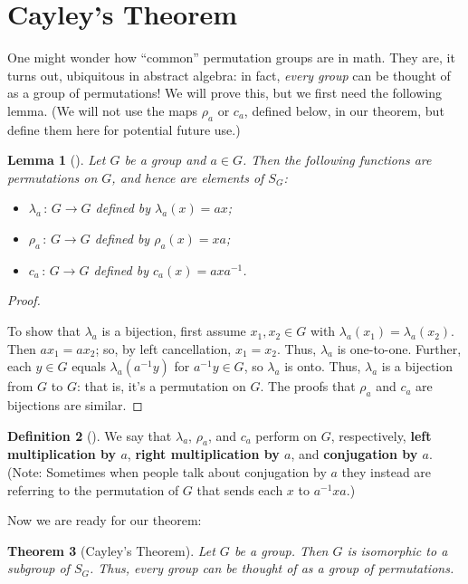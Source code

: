 \documentclass[10pt,]{book}
\newcommand{\terminology}[1]{\textbf{#1}}
\theoremstyle{plain}
\newtheorem{theorem}{Theorem}[section]
\newtheorem{lemma}[theorem]{Lemma}
\theoremstyle{definition}
\newtheorem{definition}[theorem]{Definition}
\theoremstyle{definition}
\theoremstyle{definition}
\theoremstyle{definition}
\numberwithin{equation}{section}
\begin{document}
\section[{Cayley's Theorem}]{Cayley's Theorem}\label{section-20}
One might wonder how ``common'' permutation groups are in math. They are, it turns out, ubiquitous in abstract algebra: in fact, \emph{every group} can be thought of as a group of permutations! We will prove this, but we first need the following lemma. (We will not use the maps \(\rho_a\) or \(c_a\), defined below, in our theorem, but define them here for potential future use.)%
\begin{lemma}[{}]\label{cay_lem}
Let \(G\) be a group and \(a\in G\). Then the following functions are permutations on \(G\), and hence are elements of \(S_G\): \leavevmode%
\begin{itemize}[label=\textbullet]
\item{}\(\lambda_a\,:\,G\to G\) defined by \(\lambda_a(x)=ax\);%
\item{}\(\rho_a\,:\,G\to G\) defined by \(\rho_a(x)=xa\);%
\item{}\(c_a\,:\,G\to G\) defined by \(c_a(x)=axa^{-1}\).%
\end{itemize}
%
\end{lemma}
\begin{proof}\hypertarget{proof-29}{}
To show that \(\lambda_a\) is a bijection, first assume \(x_1,x_2 \in G\) with \(\lambda_a(x_1)=\lambda_a(x_2)\). Then \(ax_1=ax_2\); so, by left cancellation, \(x_1=x_2\). Thus, \(\lambda_a\) is one-to-one. Further, each \(y\in G\) equals \(\lambda_a(a^{-1}y)\) for \(a^{-1}y\in G\), so \(\lambda_a\) is onto. Thus, \(\lambda_a\) is a bijection from \(G\) to \(G\): that is, it's a permutation on \(G\). The proofs that \(\rho_a\) and \(c_a\) are bijections are similar.%
\end{proof}
\begin{definition}[{}]\label{definition-52}
We say that \(\lambda_a\), \(\rho_a\), and \(c_a\) perform on \(G\), respectively, \terminology{left multiplication by \(a\)}, \terminology{right multiplication by \(a\)}, and \terminology{conjugation by \(a\)}. (Note: Sometimes when people talk about conjugation by \(a\) they instead are referring to the permutation of \(G\) that sends each \(x\) to \(a^{-1}xa\).)%
\end{definition}
Now we are ready for our theorem:%
\begin{theorem}[{Cayley's Theorem}]\label{theorem-38}
Let \(G\) be a group. Then \(G\) is isomorphic to a subgroup of \(S_G\). Thus, every group can be thought of as a group of permutations.%
\end{theorem}
\end{document}
